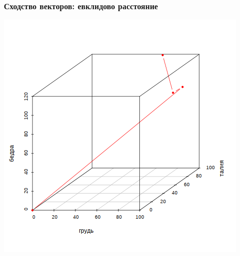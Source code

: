 \documentclass[svgnames]{beamer}
\begin{document}
\begin{frame}
  \frametitle{Сходство векторов: евклидово расстояние}
  \includegraphics[height=.9\textheight]{vectors1}
\end{frame}
\end{document}
